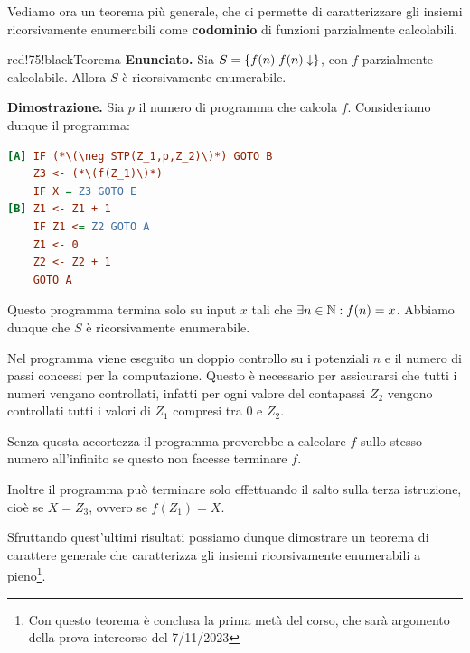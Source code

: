 Vediamo ora un teorema più generale, che ci permette di caratterizzare gli insiemi ricorsivamente enumerabili come \textbf{codominio} di funzioni parzialmente calcolabili.
\begin{halfframedbox}{red!75!black}{Teorema}
  \textbf{Enunciato. } Sia \(S = \displaystyle{\left\{{f(n) \vert f(n) \downarrow}\right\}}\), con \(f\) parzialmente calcolabile. Allora \(S\) è ricorsivamente enumerabile.
  \begin{center}
    \textcolor{red!75!black}{\hdashrule[0.5ex]{18cm}{1pt}{3mm 3pt 1mm 2pt}}
  \end{center}
  \textbf{Dimostrazione. } Sia \(p\) il numero di programma che calcola \(f\). Consideriamo dunque il programma:
  \begin{lstlisting}[language= ini, caption = { }, nolol]
[A] IF (*\(\neg STP(Z_1,p,Z_2)\)*) GOTO B
    Z3 <- (*\(f(Z_1)\)*)
    IF X = Z3 GOTO E
[B] Z1 <- Z1 + 1
    IF Z1 <= Z2 GOTO A
    Z1 <- 0
    Z2 <- Z2 + 1
    GOTO A
  \end{lstlisting}
  Questo programma termina solo su input \(x\) tali che \(\exists n \in \mathbb{N}: f(n)=x\). Abbiamo dunque che \(S\) è ricorsivamente enumerabile.

  Nel programma viene eseguito un doppio controllo su i potenziali \(n\) e il numero di passi concessi per la computazione. Questo è necessario per assicurarsi che tutti i numeri vengano controllati, infatti per ogni valore del contapassi \(Z_2\) vengono controllati tutti i valori di \(Z_1\) compresi tra \(0\) e \(Z_2\).

  Senza questa accortezza il programma proverebbe a calcolare \(f\) sullo stesso numero all'infinito se questo non facesse terminare \(f\).

  Inoltre il programma può terminare solo effettuando il salto sulla terza istruzione, cioè se \(X=Z_3\), ovvero se \(f(Z_1)=X\).
\end{halfframedbox}

Sfruttando quest'ultimi risultati possiamo dunque dimostrare un teorema di carattere generale che caratterizza gli insiemi ricorsivamente enumerabili a pieno\footnote{Con questo teorema è conclusa la prima metà del corso, che sarà argomento della prova intercorso del 7/11/2023}.

